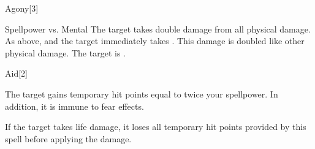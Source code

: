 \begin{spellsection}{Agony}[3]
    \begin{spellheader}
    \end{spellheader}
    \begin{spellcontent}
        \begin{spelltargetinginfo}
        \end{spelltargetinginfo}
        \begin{spelleffects}
            \begin{spellattack}{Spellpower vs. Mental}
                \spellsuccess The target takes double damage from all physical damage.
                \spellcritical As above, and the target immediately takes . This damage is doubled like other physical damage.
                \spellfailure The target is \sickened.
            \end{spellattack}
            \spelldur \durbrief
        \end{spelleffects}
    \end{spellcontent}
    \begin{spellfooter}
        \miscastrandom
    \end{spellfooter}
\end{spellsection}

\begin{spellsection}{Aid}[2]
    \begin{spellheader}
    \end{spellheader}
    \begin{spellcontent}
        \begin{spelltargetinginfo}
        \end{spelltargetinginfo}
        \begin{spelleffects}
            \spelleffect The target gains temporary hit points equal to twice your spellpower. In addition, it is immune to fear effects.
            \spelldur \durpersonallong
        \end{spelleffects}
    \end{spellcontent}
    \begin{spellfooter}
        \spellnotes If the target takes life damage, it loses all temporary hit points provided by this spell before applying the damage.
        \miscastexplode
    \end{spellfooter}
\end{spellsection}

